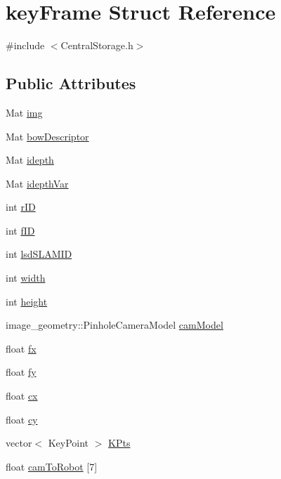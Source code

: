 \hypertarget{structkeyFrame}{\section{key\-Frame \-Struct \-Reference}
\label{structkeyFrame}
}


{\ttfamily \#include $<$\-Central\-Storage.\-h$>$}

\subsection*{\-Public \-Attributes}
\begin{DoxyCompactItemize}
\item 
\-Mat \hyperlink{structkeyFrame_a59576f76e321ecb82062edc5c7bc08fe}{img}
\item 
\-Mat \hyperlink{structkeyFrame_a12f22700cfe3b70f3a5e9f577503baf7}{bow\-Descriptor}
\item 
\-Mat \hyperlink{structkeyFrame_ac952ad626e928e521c6663e611820dac}{idepth}
\item 
\-Mat \hyperlink{structkeyFrame_a3b7c27c0435f84c12a86c00e22cfaa81}{idepth\-Var}
\item 
int \hyperlink{structkeyFrame_a3d8de485d4a812bf9dd92298ab4e1664}{r\-I\-D}
\item 
int \hyperlink{structkeyFrame_a8bbbb8e728fff6f1ee05bd8c4f846099}{f\-I\-D}
\item 
int \hyperlink{structkeyFrame_a0cf94e5999249fd9697daba9202800fe}{lsd\-S\-L\-A\-M\-I\-D}
\item 
int \hyperlink{structkeyFrame_a7c120296453059ee5b9ab853910e2c46}{width}
\item 
int \hyperlink{structkeyFrame_aa4b6b580b1cab2933803379a9fce0e0d}{height}
\item 
image\-\_\-geometry\-::\-Pinhole\-Camera\-Model \hyperlink{structkeyFrame_a61d24aeadcc9cfda14b6e99447a7971c}{cam\-Model}
\item 
float \hyperlink{structkeyFrame_a145d6d5ab1e2da4d59d34000152111cd}{fx}
\item 
float \hyperlink{structkeyFrame_a48af06b30b2f6f5a73e61afddb7ea0c4}{fy}
\item 
float \hyperlink{structkeyFrame_a237a54d29c13a64b8a3d4a597ab061c5}{cx}
\item 
float \hyperlink{structkeyFrame_ac9d3a851908cfd7587fb3e7859087e5d}{cy}
\item 
vector$<$ \-Key\-Point $>$ \hyperlink{structkeyFrame_a420102716b1d90f44af48de225f241ba}{\-K\-Pts}
\item 
float \hyperlink{structkeyFrame_a6fe79b13fb7e8e5d3b1719fa35ae7afd}{cam\-To\-Robot} \mbox{[}7\mbox{]}
\end{DoxyCompactItemize}


